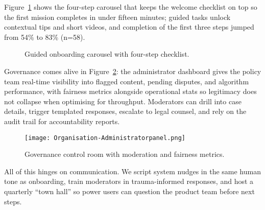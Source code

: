 Figure~\ref{fig:onboarding-flow} shows the four-step carousel that keeps the welcome checklist on top so the first mission completes in under fifteen minutes; guided tasks unlock contextual tips and short videos, and completion of the first three steps jumped from 54\% to 83\% (n=58).

\begin{figure}[H]
  \centering
  \caption{Guided onboarding carousel with four-step checklist.}
  \label{fig:onboarding-flow}
\end{figure}

Governance comes alive in Figure~\ref{fig:admin-panel}: the administrator dashboard gives the policy team real-time visibility into flagged content, pending disputes, and algorithm performance, with fairness metrics alongside operational stats so legitimacy does not collapse when optimising for throughput. Moderators can drill into case details, trigger templated responses, escalate to legal counsel, and rely on the audit trail for accountability reports.

\begin{figure}[H]
  \centering
  \texttt{[image: Organisation-Administratorpanel.png]}
  \caption{Governance control room with moderation and fairness metrics.}
  \label{fig:admin-panel}
\end{figure}

All of this hinges on communication. We script system nudges in the same human tone as onboarding, train moderators in trauma-informed responses, and host a quarterly ``town hall'' so power users can question the product team before next steps.
